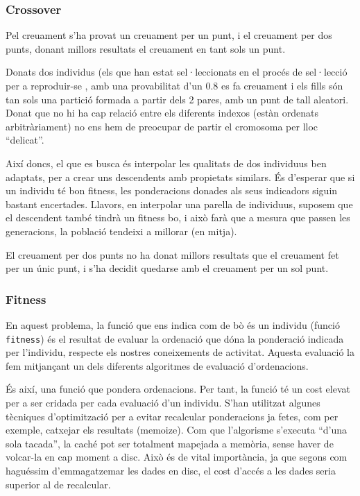 \documentclass[titlepage,a4paper,12pt]{book}
\begin{document}
\subsubsection{Crossover} %
\label{ssub:Crossover}

Pel creuament s'ha provat un creuament per un punt, i el creuament per dos
punts, donant millors resultats el creuament en tant sols un punt.  

Donats dos individus (els que han estat sel·leccionats en el procés de
sel·lecció per a reproduir-se , amb una provabilitat d'un 0.8 es fa creuament i
els fills són tan sols una partició formada a partir dels 2 pares, amb un punt
de tall aleatori.  Donat que no hi ha cap relació entre els diferents indexos
(estàn ordenats arbitràriament) no ens hem de preocupar de partir el cromosoma
per lloc ``delicat''. 

Així doncs, el que es busca és interpolar les qualitats de dos individuus ben
adaptats, per a crear uns descendents amb propietats similars.  És d'esperar que
si un individu té bon fitness, les ponderacions donades als seus indicadors
siguin bastant encertades.  Llavors, en interpolar una parella de individuus,
suposem que el descendent també tindrà un fitness bo, i això farà que a mesura
que passen les generacions, la població tendeixi a millorar (en mitja).

El creuament per dos punts no ha donat millors resultats que el creuament fet
per un únic punt, i s'ha decidit quedarse amb el creuament per un sol punt.


\subsubsection{Fitness} %
\label{ssub:Fitness}
En aquest problema, la funció que ens indica com de bò és un individu (funció
\texttt{fitness}) és el resultat de evaluar la ordenació que dóna la ponderació
indicada per l'individu, respecte els nostres coneixements de activitat. Aquesta
evaluació la fem mitjançant un dels diferents algoritmes de evaluació d'ordenacions.


És així, una funció que pondera ordenacions.  Per tant, la funció té un cost
elevat per a ser cridada per cada evaluació d'un individu.  S'han utilitzat
algunes tècniques d'optimització per a evitar recalcular ponderacions ja fetes,
com per exemple, catxejar els resultats (memoize).  Com que l'algorisme
s'executa ``d'una sola tacada'', la caché pot ser totalment mapejada a memòria,
sense haver de volcar-la en cap moment a disc.  Això és de vital importància, ja
que segons com haguéssim d'emmagatzemar les dades en disc, el cost d'accés a les
dades seria superior al de recalcular. 
\end{document}
